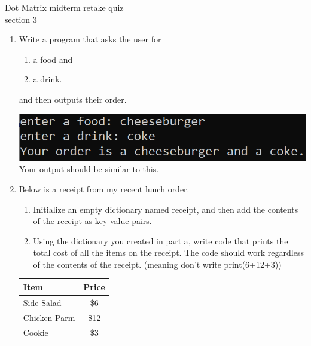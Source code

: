 \documentclass{article}
\begin{document}
\pagebreak
Dot Matrix \hfill midterm retake quiz\\
section 3\\
\begin{enumerate}
	\item 
		Write a program that asks the user for \\
		\begin{minipage}{0.5\textwidth}
		\vspace*{-0.5em}
			\begin{enumerate}  \setlength\itemsep{-0.3em}
				\item a food and
				\item a drink.  
			\end{enumerate} \vspace*{-1ex}
		and then outputs their order.
		\end{minipage}
		\begin{minipage}{0.5\textwidth}
			\centering
			\includegraphics[scale=0.75]{./imgs/outputFoodAndDrink.png}\\
			Your output should be similar to this.
		\end{minipage}



	\item 	
		Below is a receipt from my recent lunch order.
		\begin{enumerate}
			\item Initialize an empty dictionary named receipt, and then add the contents of 
				the receipt as key-value pairs.
			\item Using the dictionary you created in part a, write code that prints the 
				total cost of all the items on the receipt.  The code should work regardless
				of the contents of the receipt. (meaning don't write print(6+12+3))
		\end{enumerate}	
		\begin{center}
		        \begin{tabular}{l|c}
		            \textbf{Item} & \textbf{Price} \\ \hline
		            Side Salad & \$6 \\
		            Chicken Parm & \$12 \\
		            Cookie & \$3 \\
		        \end{tabular}
		\end{center}


\end{enumerate}
\end{document}
